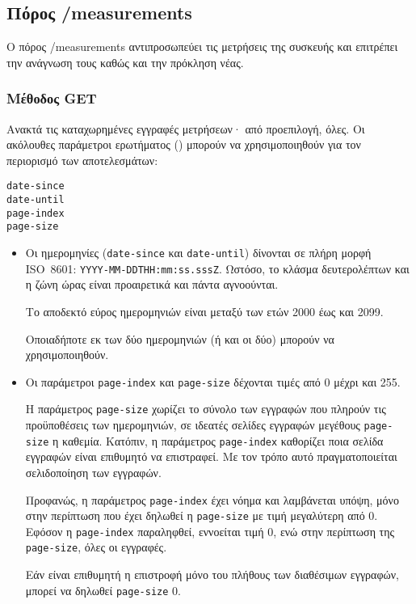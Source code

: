 \subsection{Πόρος /measurements}


Ο πόρος /measurements αντιπροσωπεύει τις μετρήσεις της συσκευής και επιτρέπει
την ανάγνωση τους καθώς και την πρόκληση νέας.


\subsubsection{Μέθοδος GET}

Ανακτά τις καταχωρημένες εγγραφές μετρήσεων· από προεπιλογή, όλες. Οι ακόλουθες
παράμετροι ερωτήματος () μπορούν να χρησιμοποιηθούν για τον
περιορισμό των αποτελεσμάτων:
\begin{lstlisting}
date-since
date-until
page-index
page-size
\end{lstlisting}
\begin{itemize}
    \item Οι ημερομηνίες (\verb~date-since~ και \verb~date-until~) δίνονται σε
    πλήρη μορφή ISO~8601: \verb~YYYY-MM-DDTHH:mm:ss.sssZ~. Ωστόσο, το κλάσμα
    δευτερολέπτων και η ζώνη ώρας είναι προαιρετικά και πάντα αγνοούνται.

    Το αποδεκτό εύρος ημερομηνιών είναι μεταξύ των ετών 2000 έως και 2099.

    Οποιαδήποτε εκ των δύο ημερομηνιών (ή και οι δύο) μπορούν να
    χρησιμοποιηθούν.

    \item Οι παράμετροι \verb~page-index~ και \verb~page-size~ δέχονται τιμές
    από 0 μέχρι και 255.

    Η παράμετρος \verb~page-size~ χωρίζει το σύνολο των εγγραφών που πληρούν
    τις προϋποθέσεις των ημερομηνιών, σε ιδεατές σελίδες εγγραφών μεγέθους
    \verb~page-size~ η καθεμία. Κατόπιν, η παράμετρος \verb~page-index~
    καθορίζει ποια σελίδα εγγραφών είναι επιθυμητό να επιστραφεί. Με τον τρόπο
    αυτό πραγματοποιείται σελιδοποίηση των εγγραφών.

    Προφανώς, η παράμετρος \verb~page-index~ έχει νόημα και λαμβάνεται υπόψη,
    μόνο στην περίπτωση που έχει δηλωθεί η \verb~page-size~ με τιμή μεγαλύτερη
    από 0. Εφόσον η \verb~page-index~ παραληφθεί, εννοείται τιμή 0, ενώ στην
    περίπτωση της \verb~page-size~, όλες οι εγγραφές.

    Εάν είναι επιθυμητή η επιστροφή μόνο του πλήθους των διαθέσιμων εγγραφών,
    μπορεί να δηλωθεί \verb~page-size~ 0.
\end{itemize}

